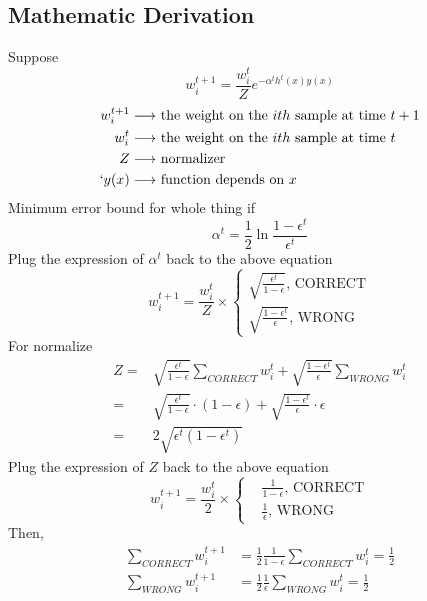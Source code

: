 \documentclass[12pt]{book}
\begin{document}
\subsection{Mathematic Derivation}
Suppose $$w^{t+1}_i=\frac{w_i^t}{Z}e^{-\alpha^th^t(x)y(x)}$$
\begin{equation*}
\begin{aligned}
w_i^{t+1}\longrightarrow&\text{ the weight on the } ith \text{ sample at time } t+1\\
w_i^{t}\longrightarrow&\text{ the weight on the } ith \text{ sample at time } t\\
Z\longrightarrow&\text{ normalizer}\\`
y(x)\longrightarrow&\text{ function depends on }
x \end{aligned}
\end{equation*}
\indent Minimum error bound for whole thing if
$$\alpha^t=\frac{1}{2}\ln \frac{1-\epsilon^t}{\epsilon^t}$$
\indent Plug the expression of $\alpha^t$ back to the above equation
$$w_i^{t+1}=\frac{w_i^{t}}{Z}\times \left\{
\begin{aligned}
\sqrt{\frac{\epsilon^t}{1-\epsilon}}\text{, CORRECT}\\
\sqrt{\frac{1-\epsilon^t}{\epsilon}
} \text{, WRONG}
\end{aligned}
\right.
$$
\indent For normalize
\begin{equation*}
\begin{aligned}
Z=&\sqrt{\frac{\epsilon^t}{1-\epsilon}}\sum_{CORRECT}w_i^t+\sqrt{\frac{1-\epsilon^t}{\epsilon}
}\sum_{WRONG}w_i^t\\
=&\sqrt{\frac{\epsilon^t}{1-\epsilon}}\cdot(1-\epsilon)+\sqrt{\frac{1-\epsilon^t}{\epsilon}
}\cdot\epsilon\\
=&2\sqrt{\epsilon^t(1-\epsilon^t)}
\end{aligned}
\end{equation*}
\indent Plug the expression of $Z$ back to the above equation
$$w_i^{t+1}=\frac{w_i^{t}}{2}\times \left\{
\begin{aligned}
&\frac{1}{1-\epsilon}\text{, CORRECT}\\
&\frac{1}{\epsilon}\text{, WRONG}
\end{aligned}
\right.
$$
\indent Then,
\begin{equation*}
\begin{aligned}
\sum_{CORRECT}w_i^{t+1}&=\frac{1}{2}\frac{1}{1-\epsilon}\sum_{CORRECT}w_i^t=\frac{1}{2}\\
\sum_{WRONG}w_i^{t+1}&=\frac{1}{2}\frac{1}{\epsilon}\sum_{WRONG}w_i^t=\frac{1}{2}\\
\end{aligned}
\end{equation*}
\end{document}
